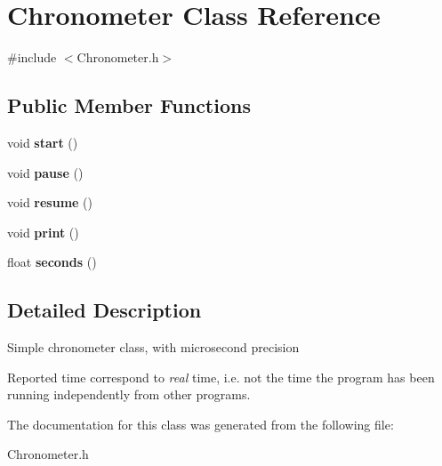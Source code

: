 \hypertarget{class_chronometer}{}\section{Chronometer Class Reference}
\label{class_chronometer}


{\ttfamily \#include $<$Chronometer.\+h$>$}

\subsection*{Public Member Functions}
\begin{DoxyCompactItemize}
\item 
\mbox{\label{class_chronometer_aef429cdb6aae70bf6a8b540e426efb96}} 
void {\bfseries start} ()
\item 
\mbox{\label{class_chronometer_a5ec9df9b8c17e695bc5cce5607df0380}} 
void {\bfseries pause} ()
\item 
\mbox{\label{class_chronometer_ac98118472c0cc0691d9891e1173f86a9}} 
void {\bfseries resume} ()
\item 
\mbox{\label{class_chronometer_a249f804f5f815299ecdb999fb3b10229}} 
void {\bfseries print} ()
\item 
\mbox{\label{class_chronometer_aec1d1b7317d9ad05e923b65855b6a49b}} 
float {\bfseries seconds} ()
\end{DoxyCompactItemize}


\subsection{Detailed Description}
Simple chronometer class, with microsecond precision

Reported time correspond to {\itshape real} time, i.\+e. not the time the program has been running independently from other programs. 

The documentation for this class was generated from the following file\+:\begin{DoxyCompactItemize}
\item 
Chronometer.\+h\end{DoxyCompactItemize}
